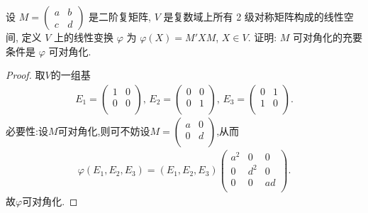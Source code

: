 \documentclass[../../main.tex]{subfiles}
\begin{document}
\begin{example}
设 $M = \begin{pmatrix} a & b \\ c & d \end{pmatrix}$ 是二阶复矩阵, $V$ 是复数域上所有 2 级对称矩阵构成的线性空间, 定义 $V$ 上的线性变换 $\varphi$ 为 $\varphi(X) = M'XM$, $X \in V$. 证明: $M$ 可对角化的充要条件是 $\varphi$ 可对角化.
\end{example}
\begin{proof}
取$V$的一组基
\begin{align*}
E_1=\begin{pmatrix}
1&		0\\
0&		0\\
\end{pmatrix},\,E_2=\begin{pmatrix}
0&		0\\
0&		1\\
\end{pmatrix},\,E_3=\begin{pmatrix}
0&		1\\
1&		0\\
\end{pmatrix}.
\end{align*}
{\heiti 必要性:}设$M$可对角化,则可不妨设$M=\begin{pmatrix}
a&		0\\
0&		d\\
\end{pmatrix}$,从而
\begin{align*}
\varphi(E_1,E_2,E_3)=(E_1,E_2,E_3)\begin{pmatrix}
a^2&		0&		0\\
0&		d^2&		0\\
0&		0&		ad\\
\end{pmatrix}.
\end{align*}
故$\varphi$可对角化.


\end{proof}
\end{document}
